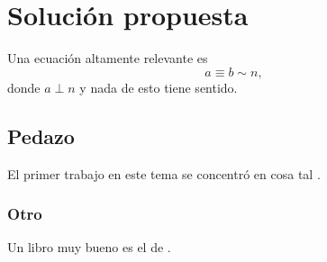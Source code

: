 \chapter{Soluci\'{o}n propuesta}

Una ecuaci\'{o}n altamente relevante es 
\begin{equation}
a \equiv b \sim n,
\end{equation}
donde $a \perp n$ y nada de esto tiene sentido.


\section{Pedazo}


El primer trabajo en este tema se concentr\'{o} en cosa tal \citep{revista}.

\subsection{Otro}

Un libro muy bueno es el de \citet{algo}.

